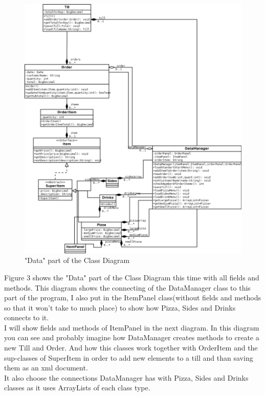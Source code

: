 \documentclass[11pt,a4paper]{article}
\begin{document}
\begin{flushleft}
 \begin{figure}[h]
	\centering
 	\includegraphics[width = 1\textwidth]{../Dia/dataDiagram.png} 
	\caption{"Data" part of the Class Diagram}
	\label{fig3}
\end{figure}

Figure 3 shows the "Data" part of the Class Diagram this time with all fields and methods.
This diagram shows the connecting of the DataManager class to this part of the program, I also put in the ItemPanel class(without fields and methods so that it won't take to much place) to show how Pizza, Sides and Drinks connects to it.\\
I will show fields and methods of ItemPanel in the next diagram. 
In this diagram you can see and probably imagine how DataManager creates methods to create a new Till and Order. And how this classes work together with OrderItem and the sup-classes of SuperItem in order to add new elements to a till and than saving them as an xml document.\\
It also choose the connections DataManager has with Pizza, Sides and Drinks classes as it uses ArrayLists of each class type.\\ 


\end{flushleft}
\end{document}
